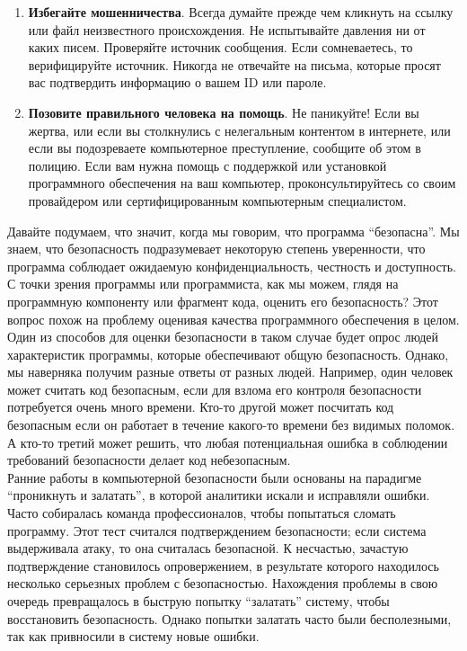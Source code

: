 \begin{enumerate}
  \item \textbf{Избегайте мошенничества}. Всегда думайте прежде чем кликнуть на ссылку или файл неизвестного происхождения. Не испытывайте давления ни от каких писем. Проверяйте источник сообщения. Если сомневаетесь, то верифицируйте источник. Никогда не отвечайте на письма, которые просят вас подтвердить информацию о вашем ID или пароле.
  \item \textbf{Позовите правильного человека на помощь}. Не паникуйте! Если вы жертва, или если вы столкнулись с нелегальным контентом в интернете, или если вы подозреваете компьютерное преступление, сообщите об этом в полицию. Если вам нужна помощь с поддержкой или установкой программного обеспечения на ваш компьютер, проконсультируйтесь со своим провайдером или сертифицированным компьютерным специалистом.
\end{enumerate}



Давайте подумаем, что значит, когда мы говорим, что программа ``безопасна''. Мы знаем, что безопасность подразумевает некоторую степень уверенности, что программа соблюдает ожидаемую конфиденциальность, честность и доступность. С точки зрения программы или программиста, как мы можем, глядя на программную компоненту или фрагмент кода, оценить его безопасность? Этот вопрос похож на проблему оценивая качества программного обеспечения в целом. Один из способов для оценки безопасности в таком случае будет опрос людей характеристик программы, которые обеспечивают общую безопасность. Однако, мы наверняка получим разные ответы от разных людей. Например, один человек может считать код безопасным, если для взлома его контроля безопасности потребуется очень много времени. Кто-то другой может посчитать код безопасным если он работает в течение какого-то времени без видимых поломок. А кто-то третий может решить, что любая потенциальная ошибка в соблюдении требований безопасности делает код небезопасным. \\

Ранние работы в компьютерной безопасности были основаны на парадигме ``проникнуть и залатать'', в которой аналитики искали и исправляли ошибки. Часто собиралась команда профессионалов, чтобы попытаться сломать программу. Этот тест считался подтверждением безопасности; если система выдерживала атаку, то она считалась безопасной. К несчастью, зачастую подтверждение становилось опровержением, в результате которого находилось несколько серьезных проблем с безопасностью. Нахождения проблемы в свою очередь превращалось в быструю попытку ``залатать'' систему, чтобы восстановить безопасность. Однако попытки залатать часто были бесполезными, так как привносили в систему новые ошибки. \\

